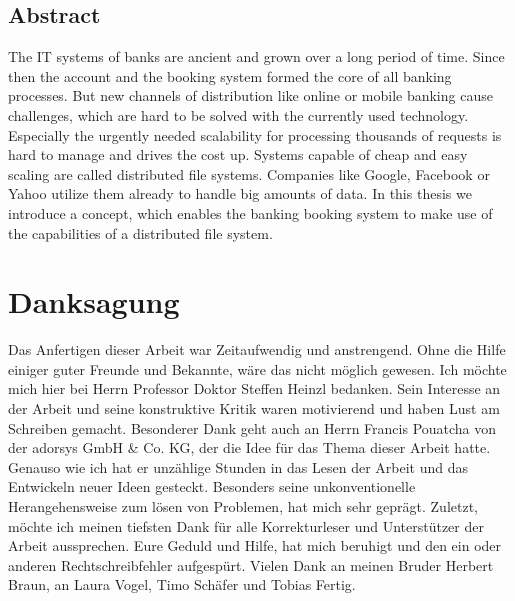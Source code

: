 \documentclass[12pt,oneside,a4paper,parskip]{scrbook}
\newcommand\blankpage{%
    \null
    \thispagestyle{empty}%
    \addtocounter{page}{-1}%
    \newpage}
\begin{document}
\section*{Abstract}

The IT systems of banks are ancient and grown over a long period of time. Since then the account and the booking system formed the core of all banking processes. But new channels of distribution like online or mobile banking cause challenges, which are hard to be solved with the currently used technology. Especially the urgently needed scalability for processing thousands of requests is hard to manage and drives the cost up. Systems capable of cheap and easy scaling are called distributed file systems. Companies like Google, Facebook or Yahoo utilize them already to handle big amounts of data. In this thesis we introduce a concept, which enables the banking booking system to make use of the capabilities of a distributed file system.

\newpage
\chapter*{Danksagung}
Das Anfertigen dieser Arbeit war Zeitaufwendig und anstrengend. Ohne die Hilfe einiger guter Freunde und Bekannte, wäre das nicht möglich gewesen. Ich möchte mich hier bei Herrn Professor Doktor Steffen Heinzl bedanken. Sein Interesse an der Arbeit und seine konstruktive Kritik waren motivierend und haben Lust am Schreiben gemacht. Besonderer Dank geht auch an Herrn Francis Pouatcha von der adorsys GmbH \& Co. KG, der die Idee für das Thema dieser Arbeit hatte. Genauso wie ich hat er unzählige Stunden in das Lesen der Arbeit und das Entwickeln neuer Ideen gesteckt. Besonders seine unkonventionelle Herangehensweise zum lösen von Problemen, hat mich sehr geprägt. Zuletzt, möchte ich meinen tiefsten Dank für alle Korrekturleser und Unterstützer der Arbeit aussprechen. Eure Geduld und Hilfe, hat mich beruhigt und den ein oder anderen Rechtschreibfehler aufgespürt. Vielen Dank an meinen Bruder Herbert Braun, an Laura Vogel, Timo Schäfer und Tobias Fertig.

\afterpage{\blankpage}
\tableofcontents										




\mainmatter
\end{document}
